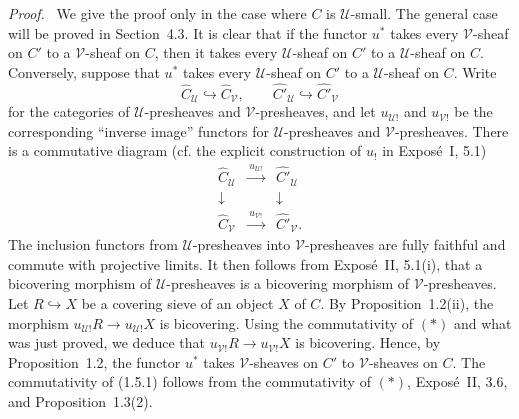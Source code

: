 \documentclass[11pt]{article}
\newcommand{\U}{\mathcal{U}}
\newcommand{\V}{\mathcal{V}}
\newenvironment{prooftext}{\par\noindent\emph{Proof.}\ }{\par\medskip}
\begin{document}
\begin{prooftext}
We give the proof only in the case where \(C\) is \(\U\)-small. The general case will be proved in Section~4.3. It is clear that if the functor \(u^*\) takes every \(\V\)-sheaf on \(C'\) to a \(\V\)-sheaf on \(C\), then it takes every \(\U\)-sheaf on \(C'\) to a \(\U\)-sheaf on \(C\). Conversely, suppose that \(u^*\) takes every \(\U\)-sheaf on \(C'\) to a \(\U\)-sheaf on \(C\). Write
\[
\widehat C_{\U}\hookrightarrow\widehat C_{\V},
\qquad
\widehat {C'}_{\U}\hookrightarrow\widehat {C'}_{\V}
\]
for the categories of \(\U\)-presheaves and \(\V\)-presheaves, and let \(u_{\U!}\) and \(u_{\V!}\) be the corresponding ``inverse image'' functors for \(\U\)-presheaves and \(\V\)-presheaves. There is a commutative diagram (cf. the explicit construction of \(u_!\) in Expos\'e~I, 5.1)
\[
\begin{array}{ccc}
\widehat C_{\U}&\xrightarrow{\ u_{\U!}\ }&\widehat {C'}_{\U}\\
\downarrow&&\downarrow\\
\widehat C_{\V}&\xrightarrow{\ u_{\V!}\ }&\widehat {C'}_{\V}.
\end{array}
\tag{*}
\]
The inclusion functors from \(\U\)-presheaves into \(\V\)-presheaves are fully faithful and commute with projective limits. It then follows from Expos\'e~II, 5.1(i), that a bicovering morphism of \(\U\)-presheaves is a bicovering morphism of \(\V\)-presheaves. Let \(R\hookrightarrow X\) be a covering sieve of an object \(X\) of \(C\). By Proposition~1.2(ii), the morphism \(u_{\U!}R\to u_{\U!}X\) is bicovering. Using the commutativity of \((*)\) and what was just proved, we deduce that \(u_{\V!}R\to u_{\V!}X\) is bicovering. Hence, by Proposition~1.2, the functor \(u^*\) takes \(\V\)-sheaves on \(C'\) to \(\V\)-sheaves on \(C\). The commutativity of (1.5.1) follows from the commutativity of \((*)\), Expos\'e~II, 3.6, and Proposition~1.3(2).
\end{prooftext}
\end{document}
